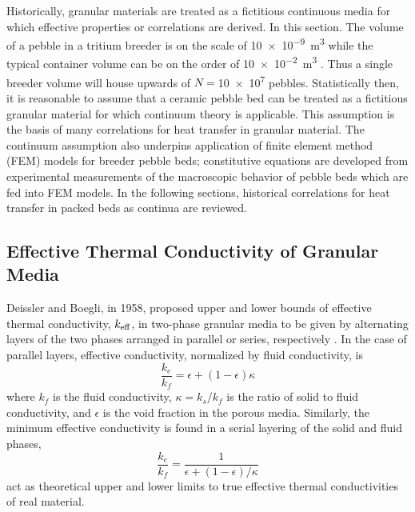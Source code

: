 Historically, granular materials are treated as a fictitious continuous media for which effective properties or correlations are derived. In this section. The volume of a pebble in a tritium breeder is on the scale of \SI{10e-9}{\cubic\meter} while the typical container volume can be on the order of \SI{10e-2}{\cubic\meter} \cite{Cho2008}.  Thus a single breeder volume will house upwards of $N =$\num{10e7} pebbles. Statistically then, it is reasonable to assume that a ceramic pebble bed can be treated as a fictitious granular material for which continuum theory is applicable. This assumption is the basis of many correlations for heat transfer in granular material. The continuum assumption also underpins application of finite element method (FEM) models for breeder pebble beds; constitutive equations are developed from experimental measurements of the macroscopic behavior of pebble beds which are fed into FEM models. In the following sections, historical correlations for heat transfer in packed beds as continua are reviewed.




\subsection{Effective Thermal Conductivity of Granular Media}


Deissler and Boegli, in 1958, proposed upper and lower bounds of effective thermal conductivity, $k_\text{eff}$, in two-phase granular media to be given by alternating layers of the two phases arranged in parallel or series, respectively \cite{Deissler1958}. In the case of parallel layers, effective conductivity, normalized by fluid conductivity, is
\begin{equation}\label{eq:keff-parallel}
	\frac{k_e}{k_f} = \epsilon + (1-\epsilon)\kappa
\end{equation}
where $k_f$ is the fluid conductivity, $\kappa = k_s/k_f$ is the ratio of solid to fluid conductivity, and $\epsilon$ is the void fraction in the porous media. Similarly, the minimum effective conductivity is found in a serial layering of the solid and fluid phases,
\begin{equation}\label{eq:keff-series}
	\frac{k_e}{k_f} = \frac{1}{\epsilon + (1-\epsilon)/\kappa}
\end{equation}
 act as theoretical upper and lower limits to true effective thermal conductivities of real material. %

